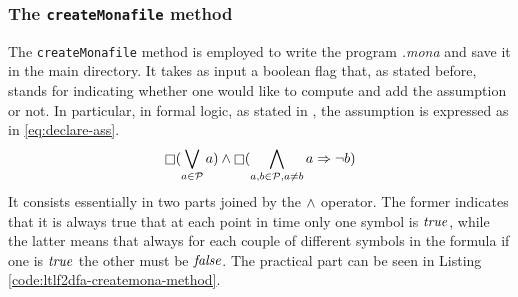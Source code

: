 \subsubsection{The \texttt{createMonafile} method}
The \texttt{createMonafile} method is employed to write the program \textit{.mona} and save it in the main directory. It takes as input a boolean flag that, as stated before, stands for indicating whether one would like to compute and add the \declare assumption or not. In particular, in formal logic, as stated in \citep{DeGiacomo:2014:RLF:2893873.2894033}, the \declare assumption is expressed as in \ref{eq:declare-ass}.
\begin{equation}\label{eq:declare-ass}
\Always (\bigvee_{a \in \P} a) \lAND \Always (\bigwedge_{a,b \in \P, a \neq b} a \Rightarrow \NOT b) 
\end{equation}
It consists essentially in two parts joined by the $\wedge$ operator. The former indicates that it is always true that at each point in time only one symbol is $\mathit{true}$, while the latter means that always for each couple of different symbols in the formula if one is $\mathit{true}$ the other must be $\mathit{false}$.
The practical part can be seen in Listing \ref{code:ltlf2dfa-createmona-method}.
